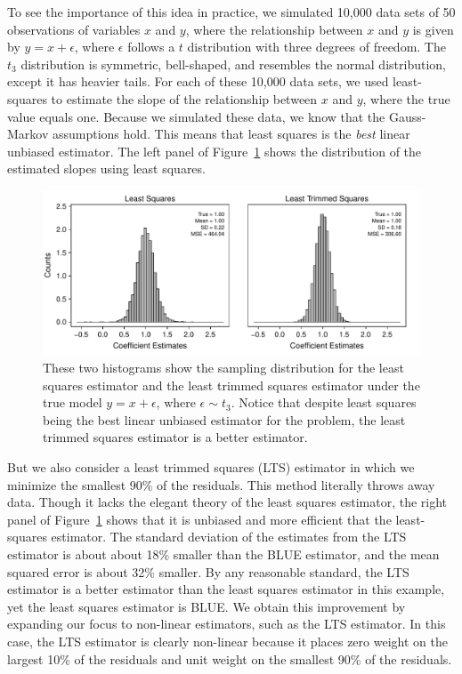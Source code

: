 \documentclass[12pt]{article}
\begin{document}
To see the importance of this idea in practice, we simulated 10,000 data sets of 50 observations of variables $x$ and $y$, where the relationship between $x$ and $y$ is given by $y = x + \epsilon$, where $\epsilon$ follows a $t$ distribution with three degrees of freedom. 
The $t_3$ distribution is symmetric, bell-shaped, and resembles the normal distribution, except it has heavier tails. 
For each of these 10,000 data sets, we used least-squares to estimate the slope of the relationship between $x$ and $y$, where the true value equals one. 
Because we simulated these data, we know that the Gauss-Markov assumptions hold. 
This means that least squares is the \textit{best} linear unbiased estimator. 
The left panel of Figure~\ref{fig:lts-illustration} shows the distribution of the estimated slopes using least squares.

\begin{figure}[h!]
\begin{center}
\includegraphics[scale = .7]{figs/lts-illustration.pdf}
\caption{These two histograms show the sampling distribution for the least squares estimator and the least trimmed squares estimator under the true model $y = x + \epsilon$, where $\epsilon \sim t_3$. 
Notice that despite least squares being the best linear unbiased estimator for the problem, the least trimmed squares estimator is a better estimator.}\label{fig:lts-illustration}
\end{center}
\end{figure}

But we also consider a least trimmed squares (LTS) estimator in which we minimize the smallest 90\% of the residuals. 
This method literally throws away data. 
Though it lacks the elegant theory of the least squares estimator, the right panel of Figure~\ref{fig:lts-illustration} shows that it is unbiased and more efficient that the least-squares estimator. 
The standard deviation of the estimates from the LTS estimator is about about 18\% smaller than the BLUE estimator, and the mean squared error is about 32\% smaller. 
By any reasonable standard, the LTS estimator is a better estimator than the least squares estimator in this example, yet the least squares estimator is BLUE\@. 
We obtain this improvement by expanding our focus to non-linear estimators, such as the LTS estimator. 
In this case, the LTS estimator is clearly non-linear because it places zero weight on the largest 10\% of the residuals and unit weight on the smallest 90\% of the residuals.
\end{document}
